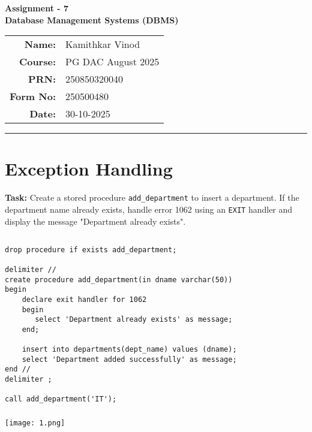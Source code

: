 \documentclass[12pt, a4paper]{article}
\begin{document}
\begin{center}
    \LARGE \textbf{Assignment - 7} \\[0.5cm]
    \Large \textbf{Database Management Systems (DBMS)} \\[1cm]

    \begin{tabular}{rl}
        \textbf{Name:} & Kamithkar Vinod \\
        \textbf{Course:} & PG DAC August 2025 \\
        \textbf{PRN:} & 250850320040 \\
        \textbf{Form No:} & 250500480 \\
        \textbf{Date:} & 30-10-2025 \\
    \end{tabular}
\end{center}

\vspace{1cm}
\hrule
\vspace{0.5cm}


\section{Exception Handling}
\textbf{Task:} Create a stored procedure \texttt{add\_department} to insert a department. 
If the department name already exists, handle error 1062 using an \texttt{EXIT} handler 
and display the message "Department already exists".

\subsection{}
\begin{lstlisting}
drop procedure if exists add_department;

delimiter //
create procedure add_department(in dname varchar(50))
begin
    declare exit handler for 1062
    begin
	   select 'Department already exists' as message;
    end;

    insert into departments(dept_name) values (dname);
    select 'Department added successfully' as message;
end //
delimiter ;

call add_department('IT');
\end{lstlisting}

\subsubsection{}
\begin{center}
    \texttt{[image: 1.png]}
\end{center}
\end{document}
